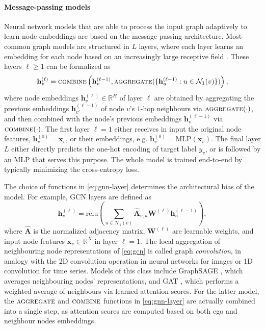 \documentclass[final,5p,times,twocolumn]{elsarticle}
\begin{document}
\paragraph{Message-passing models}

Neural network models that are able to process the input graph adaptively to learn node embeddings are based on the message-passing architecture.
Most common graph models are structured in $L$ layers, where each layer learns an embedding for each node based on an increasingly large receptive field \cite{Micheli2009}.
These layers $\ell \geq 1$ can be formalized as \cite{Xu2019}
\begin{equation}\label{eq:gnn-layer}
	\mathbf{h}_v^{(\ell)} = \textsc{combine}\left(\mathbf{h}_v^{(\ell-1)}, \textsc{aggregate}(\{\mathbf{h}_{u}^{(\ell-1)} : u \in \mathcal{N}_1(v)\})\right),
\end{equation}
where node embeddings $\mathbf{h}_v^{(\ell)} \in \mathbb{R}^H$ of layer $\ell$ are obtained by aggregating the previous embeddings $\mathbf{h}_{v'}^{(\ell-1)}$ of node $v$'s $1$-hop neighbours via $\textsc{aggregate}(\cdot)$, and then combined with the node's previous embeddings $\mathbf{h}_v^{(\ell-1)}$ via $\textsc{combine}(\cdot)$.
The first layer $\ell = 1$ either receives in input the original node features, $\mathbf{h}_v^{(0)} = \mathbf{x}_v$, or their embeddings, e.g.  $\mathbf{h}_v^{(0)} = \mathrm{MLP}(\mathbf{x}_v)$.
The final layer $L$ either directly predicts the one-hot encoding of target label $y_v$, or is followed by an MLP that serves this purpose.
The whole model is trained end-to-end by typically minimizing the cross-entropy loss.

The choice of functions in \eqref{eq:gnn-layer} determines the architectural bias of the model.
For example, GCN \cite{Kipf2017} layers are defined as
\begin{equation}\label{eq:gcn}
	\mathbf{h}_v^{(\ell)} = \mathrm{relu}\left(\sum_{u \in \mathcal{N}_1(v)} \mathbf{\hat{A}}_{v,u} \mathbf{W}^{(\ell)} \mathbf{h}_{u}^{(\ell-1)}\right),
\end{equation}
where $\mathbf{\hat{A}}$ is the normalized adjacency matrix, $\mathbf{W}^{(\ell)}$ are learnable weights, and input node features $\mathbf{x}_v \in \mathbb{R}^X$ in layer $\ell = 1$.
The local aggregation of neighbouring node representations of \eqref{eq:gcn} is called graph \emph{convolution}, in analogy with the 2D convolution operation in neural networks for images or 1D convolution for time series.
Models of this class include GraphSAGE \cite{Hamilton2017}, which averages neighbouring nodes' representations, and GAT \cite{Velickovic2018}, which performs a weighted average of neighbours via learned attention scores.
For the latter model, the $\textsc{aggregate}$ and $\textsc{combine}$ functions in \eqref{eq:gnn-layer} are actually combined into a single step, as attention scores are computed based on both ego and neighbour nodes embeddings.
\end{document}
